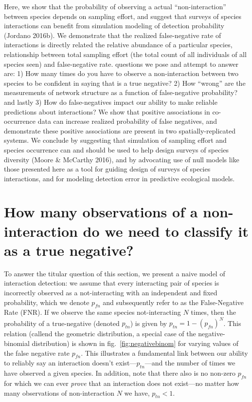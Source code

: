 \documentclass[10pt,oneside]{article}
\begin{document}
Here, we show that the probability of observing a actual
``non-interaction'' between species depends on sampling effort, and
suggest that surveys of species interactions can benefit from simulation
modeling of detection probability (Jordano 2016b). We demonstrate that
the realized false-negative rate of interactions is directly related the
relative abundance of a particular species, relationship between total
sampling effort (the total count of all individuals of all species seen)
and false-negative rate. questions we pose and attempt to answer are: 1)
How many times do you have to observe a non-interaction between two
species to be confident in saying that is a true negative? 2) How
``wrong'' are the measurements of network structure as a function of
false-negative probability? and lastly 3) How do false-negatives impact
our ability to make reliable predictions about interactions? We show
that positive associations in co-occurrence data can increase realized
probability of false negatives, and demonstrate these positive
associations are present in two spatially-replicated systems. We
conclude by suggesting that simulation of sampling effort and species
occurrence can and should be used to help design surveys of species
diversity (Moore \& McCarthy 2016), and by advocating use of null models
like those presented here as a tool for guiding design of surveys of
species interactions, and for modeling detection error in predictive
ecological models.

\hypertarget{how-many-observations-of-a-non-interaction-do-we-need-to-classify-it-as-a-true-negative}{%
\section{How many observations of a non-interaction do we need to
classify it as a true
negative?}\label{how-many-observations-of-a-non-interaction-do-we-need-to-classify-it-as-a-true-negative}}

To answer the titular question of this section, we present a naive model
of interaction detection: we assume that every interacting pair of
species is incorrectly observed as a not-interacting with an independent
and fixed probability, which we denote \(p_{fn}\) and subsequently refer
to as the False-Negative Rate (FNR). If we observe the same species
not-interacting \(N\) times, then the probability of a true-negative
(denoted \(p_{tn}\)) is given by \(p_{tn} = 1 - (p_{fn})^N\). This
relation (callend the geometric distribution, a special case of the
negative-binomial distribution) is shown in fig.~\ref{fig:negativebinom}
for varying values of the false negative rate \(p_{fn}\). This
illustrates a fundamental link between our ability to reliably say an
interaction doesn't exist---\(p_{tn}\)---and the number of times we have
observed a given species. In addition, note that there also is no
non-zero \(p_{fn}\) for which we can ever \emph{prove} that an
interaction does not exist---no matter how many observations of
non-interaction \(N\) we have, \(p_{tn} < 1\).
\end{document}
